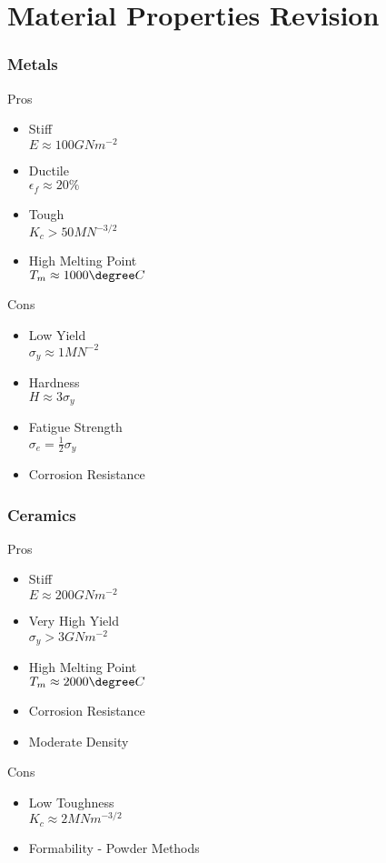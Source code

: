 \section{Material Properties Revision} %
\label{sec:material_properties_revision}

\subsubsection{Metals}
\begin{multicols*}{2}
  Pros
  \begin{itemize}[leftmargin=.5cm]
    \item Stiff \\ $E \approx 100GNm^{-2}$
    \item Ductile \\ $\epsilon_f \approx 20\%$
    \item Tough \\ $K_c > 50 MN^{-3/2}$
    \item High Melting Point \\ $T_m \approx 1000\degree C$
  \end{itemize}
  \vfill\null
  \columnbreak
  Cons
  \begin{itemize}[leftmargin=.5cm]
    \item Low Yield \\ $\sigma_y \approx 1MN^{-2}$
    \item Hardness\\ $H \approx 3\sigma_y$
    \item Fatigue Strength \\ $\sigma_e = \frac{1}{2}\sigma_y$
    \item Corrosion Resistance
  \end{itemize}
  \vfill\null
\end{multicols*}

\subsubsection{Ceramics}
\begin{multicols*}{2}
Pros
\begin{itemize}[leftmargin=.5cm]
  \item Stiff \\ $E \approx 200 GNm^{-2}$
  \item Very High Yield \\ $\sigma_y > 3 GNm^{-2}$
  \item High Melting Point \\ $T_m \approx 2000\degree C$
  \item Corrosion Resistance
  \item Moderate Density
\end{itemize}
\vfill\null
\columnbreak

Cons
\begin{itemize}[leftmargin=.5cm]
  \item Low Toughness \\ $K_c \approx 2 MNm^{-3/2}$
  \item Formability - Powder Methods
\end{itemize}

\end{multicols*}


